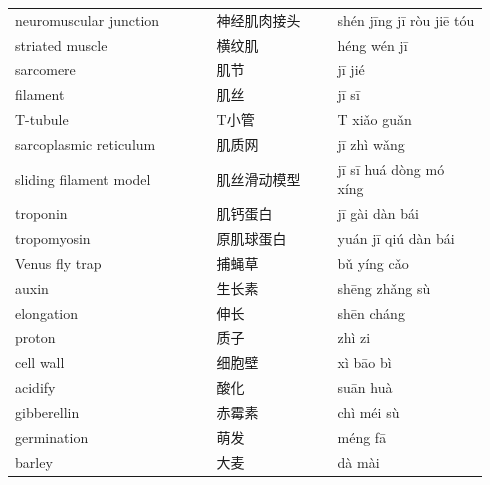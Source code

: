 \documentclass[11pt]{article}
\begin{document}
\begin{longtable}{@{}p{0.40\linewidth}p{0.24\linewidth}p{0.30\linewidth}@{}}
neuromuscular junction & 神经肌肉接头 & shén jīng jī ròu jiē tóu \\
striated muscle & 横纹肌 & héng wén jī \\
sarcomere & 肌节 & jī jié \\
filament & 肌丝 & jī sī \\
T-tubule & T小管 & T xiǎo guǎn \\
sarcoplasmic reticulum & 肌质网 & jī zhì wǎng \\
sliding filament model & 肌丝滑动模型 & jī sī huá dòng mó xíng \\
troponin & 肌钙蛋白 & jī gài dàn bái \\
tropomyosin & 原肌球蛋白 & yuán jī qiú dàn bái \\
Venus fly trap & 捕蝇草 & bǔ yíng cǎo \\
auxin & 生长素 & shēng zhǎng sù \\
elongation & 伸长 & shēn cháng \\
proton & 质子 & zhì zi \\
cell wall & 细胞壁 & xì bāo bì \\
acidify & 酸化 & suān huà \\
gibberellin & 赤霉素 & chì méi sù \\
germination & 萌发 & méng fā \\
barley & 大麦 & dà mài \\
\end{longtable}
\end{document}

